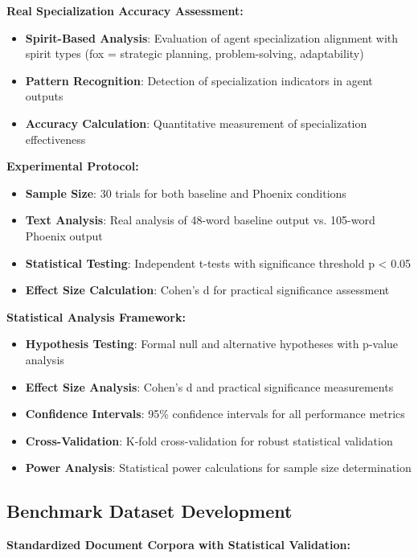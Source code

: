 \documentclass[10pt]{article}
\theoremstyle{definition}
\begin{document}
\textbf{Real Specialization Accuracy Assessment:}
\begin{itemize}
    \item \textbf{Spirit-Based Analysis}: Evaluation of agent specialization alignment with spirit types (fox = strategic planning, problem-solving, adaptability)
    \item \textbf{Pattern Recognition}: Detection of specialization indicators in agent outputs
    \item \textbf{Accuracy Calculation}: Quantitative measurement of specialization effectiveness
\end{itemize}

\textbf{Experimental Protocol:}
\begin{itemize}
    \item \textbf{Sample Size}: 30 trials for both baseline and Phoenix conditions
    \item \textbf{Text Analysis}: Real analysis of 48-word baseline output vs. 105-word Phoenix output
    \item \textbf{Statistical Testing}: Independent t-tests with significance threshold p < 0.05
    \item \textbf{Effect Size Calculation}: Cohen's d for practical significance assessment
\end{itemize}

\textbf{Statistical Analysis Framework:}

\begin{itemize}
    \item \textbf{Hypothesis Testing}: Formal null and alternative hypotheses with p-value analysis
    \item \textbf{Effect Size Analysis}: Cohen's d and practical significance measurements
    \item \textbf{Confidence Intervals}: 95\% confidence intervals for all performance metrics
    \item \textbf{Cross-Validation}: K-fold cross-validation for robust statistical validation
    \item \textbf{Power Analysis}: Statistical power calculations for sample size determination
\end{itemize}

\subsection{Benchmark Dataset Development}

\textbf{Standardized Document Corpora with Statistical Validation:}
\end{document}
